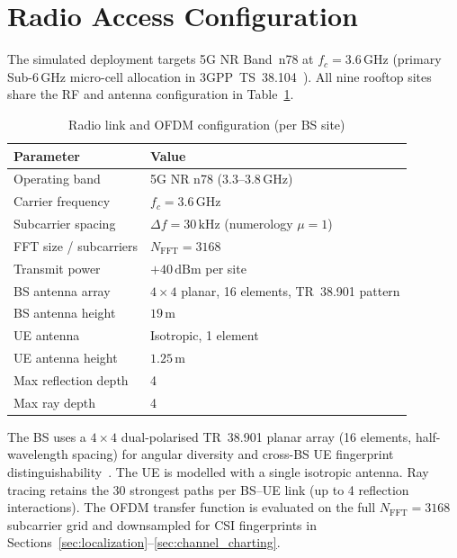 \section{Radio Access Configuration}
\label{sec:radio}

The simulated deployment targets 5G NR Band~n78 at $f_c = 3.6\,\text{GHz}$
(primary Sub-6\,GHz micro-cell allocation in 3GPP~TS~38.104~\cite{3gpp_ts38104,3gpp_nr_channel}).
All nine rooftop sites share the RF and antenna configuration in Table~\ref{tab:radio_spec}.

\begin{table}[htbp]
  \caption{Radio link and OFDM configuration (per BS site)}
  \label{tab:radio_spec}
  \centering
  \begin{tabular}{ll}
    \toprule
    Parameter & Value \\
    \midrule
    Operating band          & 5G NR n78 ($3.3$--$3.8\,\text{GHz}$) \\
    Carrier frequency       & $f_c = 3.6\,\text{GHz}$ \\
    Subcarrier spacing      & $\Delta f = 30\,\text{kHz}$ (numerology $\mu=1$) \\
    FFT size / subcarriers  & $N_{\mathrm{FFT}} = 3168$ \\
    Transmit power          & $+40\,\text{dBm}$ per site \\
    BS antenna array        & $4\times4$ planar, 16 elements,
                              TR~38.901 pattern \\
    BS antenna height       & $19\,\text{m}$ \\
    UE antenna              & Isotropic, 1 element \\
    UE antenna height       & $1.25\,\text{m}$ \\
    Max reflection depth    & 4 \\
    Max ray depth           & 4 \\
    \bottomrule
  \end{tabular}
\end{table}

The BS uses a $4\times4$ dual-polarised TR~38.901 planar array (16 elements, half-wavelength spacing)
for angular diversity and cross-BS UE fingerprint distinguishability~\cite{hoydis2023sionna_rt,dahlman2018_5gnr}.
The UE is modelled with a single isotropic antenna.
Ray tracing retains the 30 strongest paths per BS--UE link (up to 4 reflection interactions).
The OFDM transfer function is evaluated on the full $N_{\mathrm{FFT}}=3168$ subcarrier grid
and downsampled for CSI fingerprints in Sections~\ref{sec:localization}--\ref{sec:channel_charting}.
